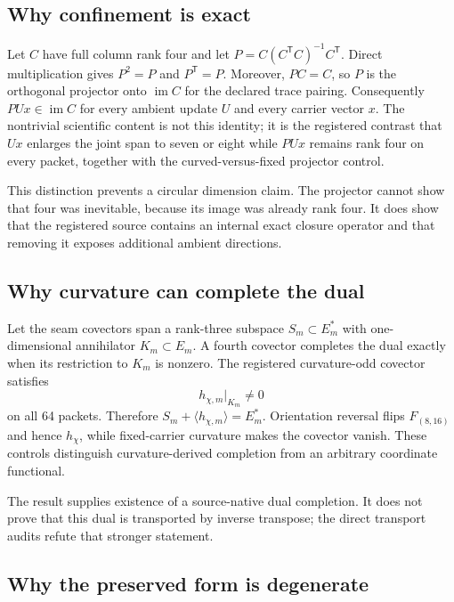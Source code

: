 \documentclass[12pt,a4paper,twoside]{article}
\begin{document}
\subsection{Why confinement is exact}

Let $C$ have full column rank four and let $P=C(C^{\mathsf T}C)^{-1}C^{\mathsf T}$. Direct multiplication gives $P^2=P$ and $P^{\mathsf T}=P$. Moreover, $PC=C$, so $P$ is the orthogonal projector onto $\operatorname{im}C$ for the declared trace pairing. Consequently $PUx\in\operatorname{im}C$ for every ambient update $U$ and every carrier vector $x$. The nontrivial scientific content is not this identity; it is the registered contrast that $Ux$ enlarges the joint span to seven or eight while $PUx$ remains rank four on every packet, together with the curved-versus-fixed projector control.

This distinction prevents a circular dimension claim. The projector cannot show that four was inevitable, because its image was already rank four. It does show that the registered source contains an internal exact closure operator and that removing it exposes additional ambient directions.

\subsection{Why curvature can complete the dual}

Let the seam covectors span a rank-three subspace $S_m\subset E_m^*$ with one-dimensional annihilator $K_m\subset E_m$. A fourth covector completes the dual exactly when its restriction to $K_m$ is nonzero. The registered curvature-odd covector satisfies
\begin{equation}
h_{\chi,m}|_{K_m}\neq0
\end{equation}
on all 64 packets. Therefore $S_m+\langle h_{\chi,m}\rangle=E_m^*$. Orientation reversal flips $F_{(8,16)}$ and hence $h_\chi$, while fixed-carrier curvature makes the covector vanish. These controls distinguish curvature-derived completion from an arbitrary coordinate functional.

The result supplies existence of a source-native dual completion. It does not prove that this dual is transported by inverse transpose; the direct transport audits refute that stronger statement.

\subsection{Why the preserved form is degenerate}
\end{document}
